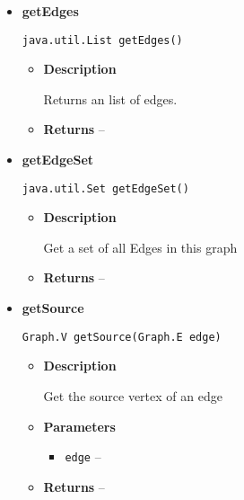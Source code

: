 {{{{{\begin{itemize}
{\begin{itemize}
{get a list of all edges of a vertex
}
\item{
{\bf  Parameters}
  \begin{itemize}
   \item{
\texttt{vertex} -- }
  \end{itemize}
}%
\item{{\bf  Returns} -- 
 
}%
\end{itemize}
}%
\item{ 
{\bf  getEdges}\\
\begin{lstlisting}[frame=none]
java.util.List getEdges()\end{lstlisting} %
\begin{itemize}
\item{
{\bf  Description}

Returns an list of edges.
}
\item{{\bf  Returns} -- 
 
}%
\end{itemize}
}%
\item{ 
{\bf  getEdgeSet}\\
\begin{lstlisting}[frame=none]
java.util.Set getEdgeSet()\end{lstlisting} %
\begin{itemize}
\item{
{\bf  Description}

Get a set of all Edges in this graph
}
\item{{\bf  Returns} -- 
 
}%
\end{itemize}
}%
\item{ 
{\bf  getSource}\\
\begin{lstlisting}[frame=none]
Graph.V getSource(Graph.E edge)\end{lstlisting} %
\begin{itemize}
\item{
{\bf  Description}

Get the source vertex of an edge
}
\item{
{\bf  Parameters}
  \begin{itemize}
   \item{
\texttt{edge} -- }
  \end{itemize}
}%
\item{{\bf  Returns} -- 
 
}
\end{itemize}}
\end{itemize}}}}}}
